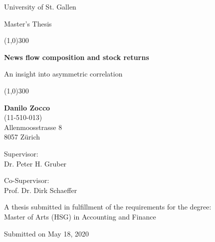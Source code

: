 \begin{titlepage}
    \begin{center}
    
        \huge
        University of St. Gallen
        
        \vspace*{1cm}
        
        \Large
        Master's Thesis
        
        \vspace*{0.2cm}
        
        \line(1,0){300}
        
        \vspace*{0.2cm}

        \large
        \textbf{News flow composition and stock returns}

        \vspace{0.5cm}
        
        \normalsize
        An insight into asymmetric correlation
        
        \vspace*{0.2cm}
        
        \line(1,0){300}
            
        \vspace{1.5cm}
        
        \textbf{Danilo Zocco}\\
        \small
        (11-510-013)\\
        \normalsize
        Allenmoosstrasse 8\\
        8057 Zürich
        
        \vspace{1.5cm}
        
        Supervisor:\\
        Dr. Peter H. Gruber
        
        \vspace{0.6cm}
       
        Co-Supervisor:\\
        Prof. Dr. Dirk Schaeffer

        \vfill
            
        A thesis submitted in fulfillment of the requirements for the degree:\\
        Master of Arts (HSG) in Accounting and Finance
            
       \vspace{0.8cm}
       
       Submitted on May 18, 2020
       
       
   \end{center}
\end{titlepage}